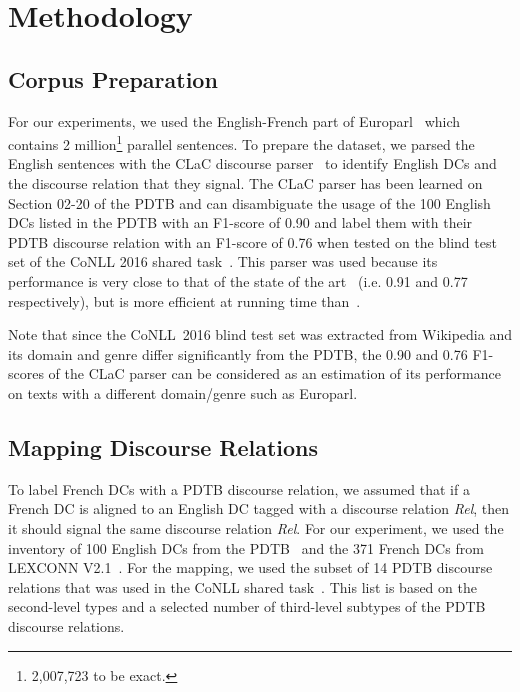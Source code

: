 \documentclass[11pt,a4paper]{article}
\begin{document}
\section{Methodology}
\label{sec:method}

\subsection{Corpus Preparation}
For our experiments, we used the English-French part of Europarl~\cite{koehn05} which contains 2 million\footnote{2,007,723 to be exact.} parallel sentences. 
To prepare the dataset, we parsed the English sentences with the CLaC discourse parser~\cite{laali16} to identify English DCs and the discourse relation that they signal. The CLaC parser has been learned on Section 02-20 of the PDTB and can disambiguate the usage of the 100 English DCs listed in the PDTB with an F1-score of 0.90 and label them with their PDTB discourse relation with an F1-score of 0.76 when tested on the blind test set of the CoNLL 2016 shared task~\cite{xue16}. This parser was used because its performance is very close to that of the state of the art~\cite{oepen16} (i.e. 0.91 and 0.77 respectively), but is more efficient at running time than~\citet{oepen16}.

Note that since the CoNLL~2016 blind test set was extracted from Wikipedia and its domain and genre differ significantly from the PDTB, the 0.90 and 0.76 F1-scores of the CLaC parser can be considered as an estimation of its performance on texts with a different domain/genre such as Europarl. 


\subsection{Mapping Discourse Relations}
\label{sec:build-dictionaries}

To label French DCs with a PDTB discourse relation, we assumed that if a French DC is aligned to an English DC tagged with a discourse relation \textit{Rel}, then it should signal the same discourse relation \textit{Rel}. For our experiment, we used the inventory of 100 English DCs from the PDTB~\cite{prasad08} and the 371 French DCs from LEXCONN V2.1~\cite{danlos15}. For the mapping, we used the subset of 14 PDTB discourse relations that was used in the CoNLL shared task~\cite{xue15}. This list is based on the second-level types and a selected number of third-level subtypes of the PDTB discourse relations. 
\end{document}
